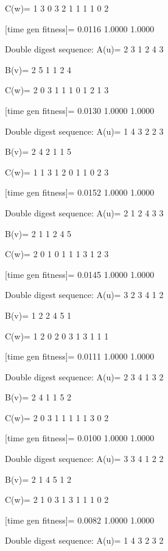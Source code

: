 C(w)=
     1     3     0     3     2     1     1     1     1     0     2

[time gen fitness]=
    0.0116    1.0000    1.0000

Double digest sequence:
A(u)=
     2     3     1     2     4     3

B(v)=
     2     5     1     1     2     4

C(w)=
     2     0     3     1     1     1     0     1     2     1     3

[time gen fitness]=
    0.0130    1.0000    1.0000

Double digest sequence:
A(u)=
     1     4     3     2     2     3

B(v)=
     2     4     2     1     1     5

C(w)=
     1     1     3     1     2     0     1     1     0     2     3

[time gen fitness]=
    0.0152    1.0000    1.0000

Double digest sequence:
A(u)=
     2     1     2     4     3     3

B(v)=
     2     1     1     2     4     5

C(w)=
     2     0     1     0     1     1     1     3     1     2     3

[time gen fitness]=
    0.0145    1.0000    1.0000

Double digest sequence:
A(u)=
     3     2     3     4     1     2

B(v)=
     1     2     2     4     5     1

C(w)=
     1     2     0     2     0     3     1     3     1     1     1

[time gen fitness]=
    0.0111    1.0000    1.0000

Double digest sequence:
A(u)=
     2     3     4     1     3     2

B(v)=
     2     4     1     1     5     2

C(w)=
     2     0     3     1     1     1     1     1     3     0     2

[time gen fitness]=
    0.0100    1.0000    1.0000

Double digest sequence:
A(u)=
     3     3     4     1     2     2

B(v)=
     2     1     4     5     1     2

C(w)=
     2     1     0     3     1     3     1     1     1     0     2

[time gen fitness]=
    0.0082    1.0000    1.0000

Double digest sequence:
A(u)=
     1     4     3     2     3     2

